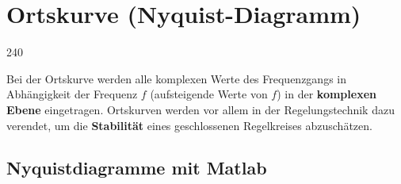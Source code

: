 \section{Ortskurve (Nyquist-Diagramm)}{240}

Bei der Ortskurve werden alle komplexen Werte des Frequenzgangs in Abhängigkeit der Frequenz $f$ (aufsteigende Werte von $f$) 
in der \textbf{komplexen Ebene} eingetragen. Ortskurven werden vor allem in der Regelungstechnik dazu verendet, um die 
\textbf{Stabilität} eines geschlossenen Regelkreises abzuschätzen. \\


\subsection{Nyquistdiagramme mit Matlab}

